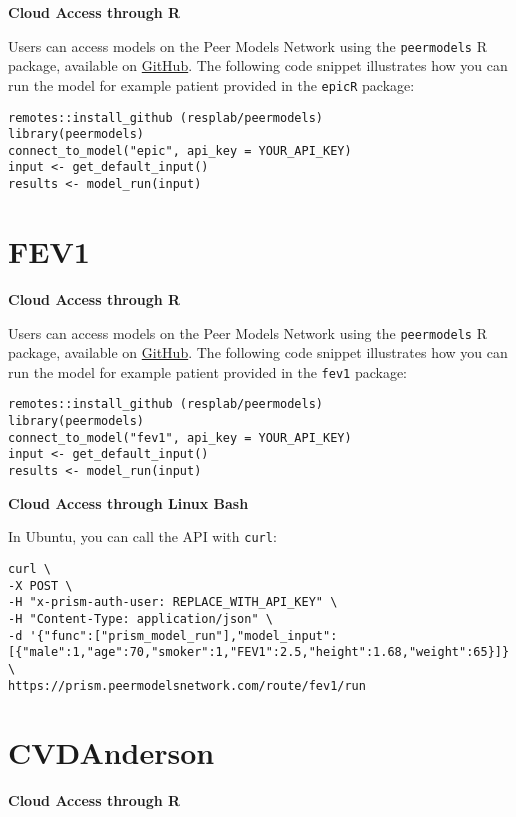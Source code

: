 \documentclass[
]{book}
\begin{document}
\textbf{Cloud Access through R}

Users can access models on the Peer Models Network using the \texttt{peermodels} R package, available on \href{https://github.com/resplab/peermodels}{GitHub}. The following code snippet illustrates how you can run the model for example patient provided in the \texttt{epicR} package:

\begin{verbatim}
remotes::install_github (resplab/peermodels)
library(peermodels)
connect_to_model("epic", api_key = YOUR_API_KEY)
input <- get_default_input()
results <- model_run(input)
\end{verbatim}

\hypertarget{fev1-1}{%
\section{FEV1}\label{fev1-1}}

\textbf{Cloud Access through R}

Users can access models on the Peer Models Network using the \texttt{peermodels} R package, available on \href{https://github.com/resplab/peermodels}{GitHub}. The following code snippet illustrates how you can run the model for example patient provided in the \texttt{fev1} package:

\begin{verbatim}
remotes::install_github (resplab/peermodels)
library(peermodels)
connect_to_model("fev1", api_key = YOUR_API_KEY)
input <- get_default_input()
results <- model_run(input)
\end{verbatim}

\textbf{Cloud Access through Linux Bash}

In Ubuntu, you can call the API with \texttt{curl}:

\begin{verbatim}
curl \
-X POST \
-H "x-prism-auth-user: REPLACE_WITH_API_KEY" \
-H "Content-Type: application/json" \
-d '{"func":["prism_model_run"],"model_input":[{"male":1,"age":70,"smoker":1,"FEV1":2.5,"height":1.68,"weight":65}]}' \
https://prism.peermodelsnetwork.com/route/fev1/run
\end{verbatim}

\hypertarget{cvdanderson-1}{%
\section{CVDAnderson}\label{cvdanderson-1}}

\textbf{Cloud Access through R}
\end{document}
